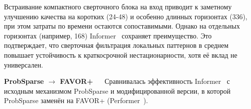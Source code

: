 Встраивание компактного сверточного блока на вход приводит к заметному улучшению качества на коротких 
(24-48) и особенно длинных горизонтах (336), при этом затраты по времени остаются сопоставимыми. 
Однако на отдельных горизонтах (например, 168) Informer~\cite{informer} сохраняет преимущество. 
Это подтверждает, 
что сверточная фильтрация локальных паттернов в среднем повышает устойчивость к краткосрочной 
нестационарности, хотя её вклад не универсален.

\label{sec:ablations2}
\textbf{ProbSparse $\to$ FAVOR+} $\quad$ Сравнивалась эффективность 
Informer~\cite{informer} с исходным механизмом ProbSparse и модифицированной версии, 
в которой ProbSparse заменён на FAVOR+ (Performer~\cite{performer}).



